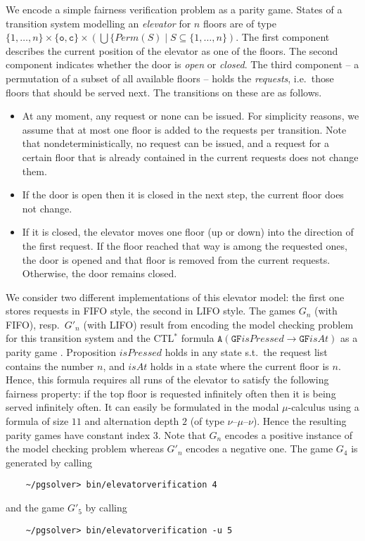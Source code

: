 We encode a simple fairness verification problem as a parity game. States of a transition system modelling
an \emph{elevator} for $n$ floors are of type
$\{1,\ldots,n\} \times \{\mathtt{o},\mathtt{c}\} \times (\bigcup \{ \mathit{Perm}(S) \mid S \subseteq \{1,\ldots,n\})$.
The first component describes the current position of the elevator as one of the floors. The
second component indicates whether the door is \emph{open} or \emph{closed}. The third component -- a permutation
of a subset of all available floors -- holds the \emph{requests}, i.e.\ those floors that should be served next.
The transitions on these are as follows.
\begin{itemize}
\item At any moment, any request or none can be issued. For simplicity reasons, we assume that at most one floor
      is added to the requests per transition. Note that nondeterministically, no request can be issued, and a
      request for a certain floor that is already contained in the current requests does not change them.
\item If the door is open then it is closed in the next step, the current floor does not change.
\item If it is closed, the elevator moves one floor (up or down) into the direction of the first request. If the
      floor reached that way is among the requested ones, the door is opened and that floor is removed from the
      current requests. Otherwise, the door remains closed.
\end{itemize}
We consider two different implementations of this elevator model: the first one stores requests in FIFO
style, the second in LIFO style. The games $G_n$ (with FIFO), resp.\ $G'_n$ (with LIFO) result from
encoding the model checking problem for this transition system and the CTL$^*$ formula
$\mathtt{A}(\mathtt{GF}\mathit{isPressed} \to \mathtt{GF}\mathit{isAt})$ as a parity game
\cite{Stirling95}.  Proposition $\mathit{isPressed}$ holds in any state s.t.\ the request list contains
the number $n$, and $\mathit{isAt}$ holds in a state where the current floor is $n$. Hence, this
formula requires all runs of the elevator to satisfy the following fairness property: if the top floor
is requested infinitely often then it is being served infinitely often. It can easily be formulated in
the modal $\mu$-calculus using a formula of size $11$ and alternation depth $2$ (of type
$\nu$--$\mu$--$\nu$). Hence the resulting parity games have constant index 3.  Note that $G_n$
encodes a positive instance of the model checking problem whereas $G'_n$ encodes a negative one.
The game $G_4$ is generated by calling
\begin{verbatim}
    ~/pgsolver> bin/elevatorverification 4
\end{verbatim}
and the game $G'_5$ by calling
\begin{verbatim}
    ~/pgsolver> bin/elevatorverification -u 5
\end{verbatim}


